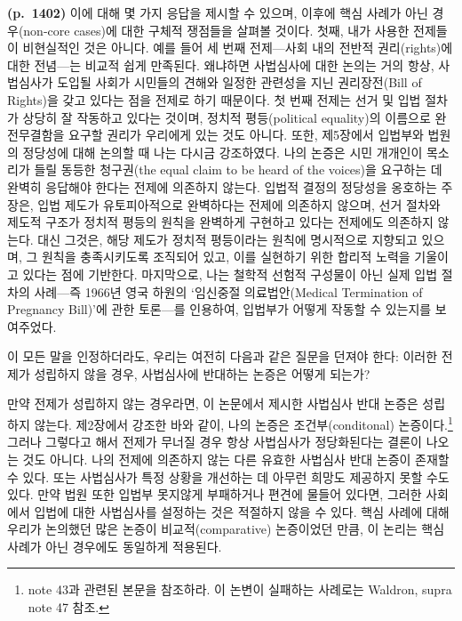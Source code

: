 \documentclass[a4paper,12pt,oneside]{article}  %
\begin{document}
\textbf{(p.~1402)} 이에 대해 몇 가지 응답을 제시할 수 있으며, 이후에
핵심 사례가 아닌 경우(non-core cases)에 대한 구체적 쟁점들을 살펴볼
것이다. 첫째, 내가 사용한 전제들이 비현실적인 것은 아니다. 예를 들어 세
번째 전제---사회 내의 전반적 권리(rights)에 대한 전념---는 비교적 쉽게
만족된다. 왜냐하면 사법심사에 대한 논의는 거의 항상, 사법심사가 도입될
사회가 시민들의 견해와 일정한 관련성을 지닌 권리장전(Bill of Rights)을
갖고 있다는 점을 전제로 하기 때문이다. 첫 번째 전제는 선거 및 입법
절차가 상당히 잘 작동하고 있다는 것이며, 정치적 평등(political
equality)의 이름으로 완전무결함을 요구할 권리가 우리에게 있는 것도
아니다. 또한, 제5장에서 입법부와 법원의 정당성에 대해 논의할 때 나는
다시금 강조하였다. 나의 논증은 시민 개개인이 목소리가 들릴 동등한
청구권(the equal claim to be heard of the voices)을 요구하는 데 완벽히
응답해야 한다는 전제에 의존하지 않는다. 입법적 결정의 정당성을 옹호하는
주장은, 입법 제도가 유토피아적으로 완벽하다는 전제에 의존하지 않으며,
선거 절차와 제도적 구조가 정치적 평등의 원칙을 완벽하게 구현하고 있다는
전제에도 의존하지 않는다. 대신 그것은, 해당 제도가 정치적 평등이라는
원칙에 명시적으로 지향되고 있으며, 그 원칙을 충족시키도록 조직되어 있고,
이를 실현하기 위한 합리적 노력을 기울이고 있다는 점에 기반한다.
마지막으로, 나는 철학적 선험적 구성물이 아닌 실제 입법 절차의 사례---즉
1966년 영국 하원의 `임신중절 의료법안(Medical Termination of Pregnancy
Bill)'에 관한 토론---를 인용하여, 입법부가 어떻게 작동할 수 있는지를
보여주었다.

이 모든 말을 인정하더라도, 우리는 여전히 다음과 같은 질문을 던져야 한다:
이러한 전제가 성립하지 않을 경우, 사법심사에 반대하는 논증은 어떻게
되는가?

만약 전제가 성립하지 않는 경우라면, 이 논문에서 제시한 사법심사 반대
논증은 성립하지 않는다. 제2장에서 강조한 바와 같이, 나의 논증은
조건부(conditonal) 논증이다.\footnote{note 43과 관련된 본문을 참조하라.
  이 논변이 실패하는 사례로는 Waldron, supra note 47 참조.} 그러나
그렇다고 해서 전제가 무너질 경우 항상 사법심사가 정당화된다는 결론이
나오는 것도 아니다. 나의 전제에 의존하지 않는 다른 유효한 사법심사 반대
논증이 존재할 수 있다. 또는 사법심사가 특정 상황을 개선하는 데 아무런
희망도 제공하지 못할 수도 있다. 만약 법원 또한 입법부 못지않게
부패하거나 편견에 물들어 있다면, 그러한 사회에서 입법에 대한 사법심사를
설정하는 것은 적절하지 않을 수 있다. 핵심 사례에 대해 우리가 논의했던
많은 논증이 비교적(comparative) 논증이었던 만큼, 이 논리는 핵심 사례가
아닌 경우에도 동일하게 적용된다.
\end{document}
